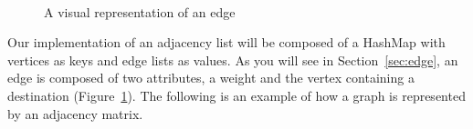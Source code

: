 \begin{figure}[H]
    \centering
    \\
    \caption{A visual representation of an edge}
    \label{fig:edge}
\end{figure}

Our implementation of an adjacency list will be composed of a HashMap with
vertices as keys and edge lists as values. As you will see in
Section~\ref{sec:edge}, an edge is composed of two attributes, a weight and the
vertex containing a destination (Figure~\ref{fig:edge}). The following is an
example of how a graph is represented by an adjacency matrix.\\

